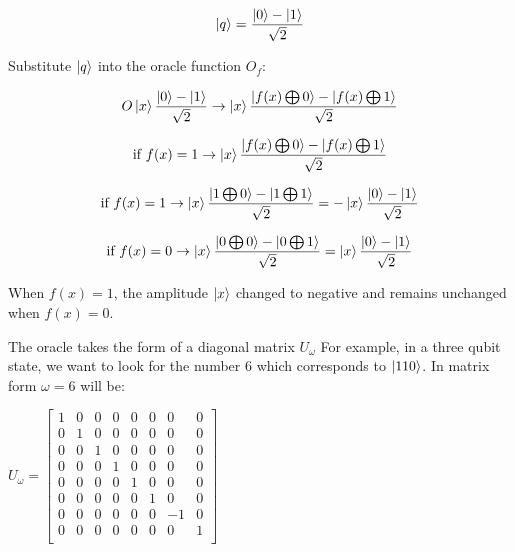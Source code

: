 \documentclass{article}
\begin{document}
\vspace{5mm}

\begin{equation}
\ket{q} = \frac{\ket{0} - \ket{1}}{\sqrt{2}}
\end{equation}
\vspace{5mm}

Substitute $\ket{q}$ into the oracle function $O_f$:
\vspace{5mm}

\begin{equation}
 O\ket{x}\frac{\ket{0} - \ket{1}}{\sqrt{2}} \rightarrow \ket{x} \frac{\ket{f(x) \bigoplus 0} - \ket{f(x) \bigoplus 1}}{\sqrt{2}}    
\end{equation}
\vspace{5mm}

\begin{equation}
\text{if} \ f(x) =1 \rightarrow \ket{x}\frac{\ket{f(x) \bigoplus0} - \ket{f(x) \bigoplus1}}{\sqrt{2}}   
\end{equation}
\vspace{5mm}

\begin{equation}
\text{if} \ f(x) =1 \rightarrow \ket{x}\frac{\ket{1 \bigoplus 0} - \ket{1 \bigoplus 1}}{\sqrt{2}} = -\ket{x}\frac{\ket{0} - \ket{1}}{\sqrt{2}}    
\end{equation}
\vspace{5mm}

\begin{equation}
\text{if} \ f(x) =0 \rightarrow \ket{x}\frac{\ket{0 \bigoplus 0} - \ket{0 \bigoplus 1}}{\sqrt{2}} = \ket{x}\frac{\ket{0} - \ket{1}}{\sqrt{2}}    
\end{equation}
\vspace{5mm}

\noindent
When $f(x) = 1 $, the amplitude $\ket{x}$ changed to negative and remains unchanged when $f(x) = 0$.
\vspace{5mm}

\noindent
The oracle takes the form of a diagonal matrix $U_{\omega}$
\vspace{5mm}
\noindent
For example, in a three qubit state, we want to look for the number 6 which corresponds to $\ket{110}$. In matrix form $\omega =6$ will be:
\vspace{5mm}

\qquad $ U_\omega = \begin{bmatrix}

1 & 0 & 0 & 0 & 0& 0 & 0& 0 \\
0 & 1 & 0 & 0 & 0& 0 & 0& 0 \\
0 & 0 & 1 & 0 & 0& 0 & 0& 0 \\
0 & 0 & 0 & 1 & 0& 0 & 0& 0 \\
0 & 0 & 0 & 0 & 1& 0 & 0& 0 \\
0 & 0 & 0 & 0 & 0& 1 & 0& 0 \\
0 & 0 & 0 & 0 & 0& 0 & -1& 0 \\
0 & 0 & 0 & 0 & 0& 0 & 0& 1 \\

\end{bmatrix}$
\vspace{5mm}
\end{document}
